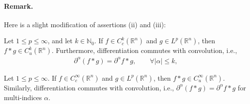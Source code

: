 \documentclass{article}
\numberwithin{equation}{section}
\theoremstyle{plain}
\theoremstyle{definition}
\begin{document}
\paragraph{Remark.} Here is a slight modification of assertions (ii) and (iii):
\begin{itemize}
{\it\item[(ii')] Let $1\leq p\leq \infty$, and let $k\in\mathbb{N}_0$. If $f\in C_c^k(\mathbb{R}^n)$ and $g\in L^p(\mathbb{R}^n)$, then $f * g\in C^k_u(\mathbb{R}^n)$. Furthermore, differentiation commutes with convolution, i.e.,
\begin{align*}
	\partial^\alpha(f*g)=\partial^\alpha f * g,\qquad\forall\vert\alpha\vert\leq k,
\end{align*}
\item[(iii')] Let $1\leq p\leq \infty$. If $f\in C_c^\infty(\mathbb{R}^n)$ and $g\in L^p(\mathbb{R}^n)$, then $f * g\in C_u^\infty(\mathbb{R}^n)$. Similarly, differentiation commutes with convolution, i.e., $\partial^\alpha(f * g)=\partial^\alpha f * g$ for multi-indices $\alpha$.}
\end{itemize}
\end{document}
